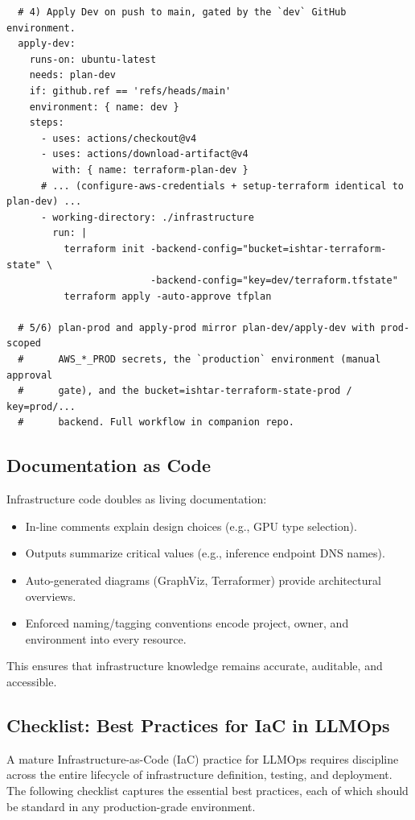 \begin{codebox}
\begin{verbatim}
  # 4) Apply Dev on push to main, gated by the `dev` GitHub environment.
  apply-dev:
    runs-on: ubuntu-latest
    needs: plan-dev
    if: github.ref == 'refs/heads/main'
    environment: { name: dev }
    steps:
      - uses: actions/checkout@v4
      - uses: actions/download-artifact@v4
        with: { name: terraform-plan-dev }
      # ... (configure-aws-credentials + setup-terraform identical to plan-dev) ...
      - working-directory: ./infrastructure
        run: |
          terraform init -backend-config="bucket=ishtar-terraform-state" \
                         -backend-config="key=dev/terraform.tfstate"
          terraform apply -auto-approve tfplan

  # 5/6) plan-prod and apply-prod mirror plan-dev/apply-dev with prod-scoped
  #      AWS_*_PROD secrets, the `production` environment (manual approval
  #      gate), and the bucket=ishtar-terraform-state-prod / key=prod/...
  #      backend. Full workflow in companion repo.
\end{verbatim}
\end{codebox}

\subsection{Documentation as Code}
\label{sec:iac-docs}

Infrastructure code doubles as living documentation:
\begin{itemize}
  \item In-line comments explain design choices (e.g., GPU type selection).
  \item Outputs summarize critical values (e.g., inference endpoint DNS names).
  \item Auto-generated diagrams (GraphViz, Terraformer) provide architectural overviews.
  \item Enforced naming/tagging conventions encode project, owner, and environment into every resource.
\end{itemize}

This ensures that infrastructure knowledge remains accurate, auditable, and accessible.

\subsection{Checklist: Best Practices for IaC in LLMOps}
\label{sec:iac-checklist}

A mature Infrastructure-as-Code (IaC) practice for LLMOps requires discipline across the entire lifecycle of infrastructure definition, testing, and deployment. The following checklist captures the essential best practices, each of which should be standard in any production-grade environment.

